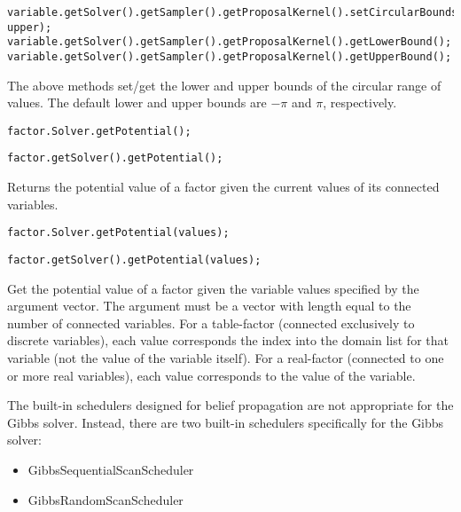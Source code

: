 \ifjava
\begin{lstlisting}
variable.getSolver().getSampler().getProposalKernel().setCircularBounds(lower, upper);
variable.getSolver().getSampler().getProposalKernel().getLowerBound();
variable.getSolver().getSampler().getProposalKernel().getUpperBound();
\end{lstlisting}
\fi

The above methods set/get the lower and upper bounds of the circular range of values.  The default lower and upper bounds are $-\pi$ and $\pi$, respectively.



\ifmatlab
\begin{lstlisting}
factor.Solver.getPotential();
\end{lstlisting}
\fi

\ifjava
\begin{lstlisting}
factor.getSolver().getPotential();
\end{lstlisting}
\fi

Returns the potential value of a factor given the current values of its connected variables.

\ifmatlab
\begin{lstlisting}
factor.Solver.getPotential(values);
\end{lstlisting}
\fi

\ifjava
\begin{lstlisting}
factor.getSolver().getPotential(values);
\end{lstlisting}
\fi

Get the potential value of a factor given the variable values specified by the argument vector. The argument must be a vector with length equal to the number of connected variables. For a table-factor (connected exclusively to discrete variables), each value corresponds the index into the domain list for that variable (not the value of the variable itself). For a real-factor (connected to one or more real variables), each value corresponds to the value of the variable.


The built-in schedulers designed for belief propagation are not appropriate for the Gibbs solver.  Instead, there are two built-in schedulers specifically for the Gibbs solver:

\begin{itemize}
\item GibbsSequentialScanScheduler
\item GibbsRandomScanScheduler
\end{itemize}

